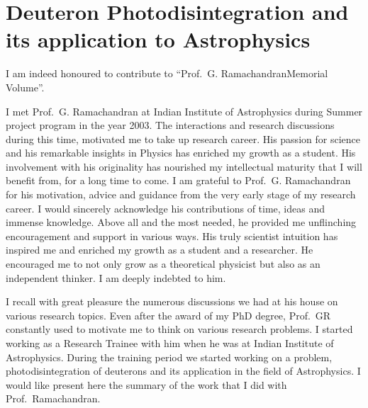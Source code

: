 \chapter[Deuteron Photodisintegration and its application to Astrophysics]{Deuteron Photodisintegration and its application to Astrophysics}\label{chap34}



I am indeed honoured to contribute to ``Prof.\ G. Ramachandran\break Memorial Volume''. 

I met Prof.\ G. Ramachandran at Indian Institute of Astrophysics during Summer project program in the year 2003. The interactions and research discussions during this time, motivated me to take up research career. His passion for science and his remarkable insights in Physics has enriched my growth as a student. His involvement with his originality has nourished my intellectual maturity that I will benefit from, for a long time to come. I am grateful to  Prof.\ G. Ramachandran for his motivation, advice and guidance from the very early stage of my research career. I would sincerely acknowledge his contributions of time, ideas and immense knowledge. Above all and the most needed, he provided me unflinching encouragement and support in various ways. His truly scientist intuition has inspired me and enriched my growth as a student and a researcher. He encouraged me to not only grow as a theoretical physicist but also as an independent thinker. I am deeply indebted to him.

I  recall with great pleasure the numerous discussions we had at his house on various research topics. Even after the award of my PhD degree, Prof.\ GR constantly used to motivate me to think on various research problems. I started working as a Research Trainee with him when he was at Indian Institute of Astrophysics. During the training period we started working on a problem, photodisintegration of deuterons and its application in the field of Astrophysics. I would like present here the summary of the work that I did with Prof.\ Ramachandran.

